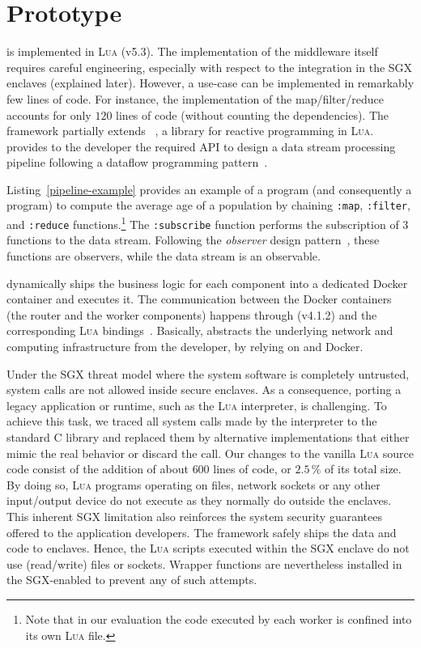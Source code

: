 
\chapter{\SS{} Prototype}
\label{chap:proto}

\SS{} is implemented in \textsc{Lua} (v5.3).
The implementation of the middleware itself requires careful engineering, especially with respect to the integration in the SGX enclaves (explained later).
However, a \SS{} use-case can be implemented in remarkably few lines of code.
For instance, the implementation of the map/filter/reduce accounts for only $120$ lines of code (without counting the dependencies).
The framework partially extends \rxl~\cite{github:rxlua}, a library for reactive programming in \textsc{Lua}.
\rxl provides to the developer the required API to design a data stream processing pipeline following a dataflow programming pattern~\cite{uustalu_essence_2005}.

Listing~\ref{pipeline-example} provides an example of a \rxl program (and consequently a \SS{} program) to compute the average age of a population by chaining \texttt{:map}, \texttt{:filter}, and \texttt{:reduce} functions.\footnote{Note that in our evaluation the code executed by each worker is confined into its own \textsc{Lua} file.}
The \texttt{:subscribe} function performs the subscription of 3 functions to the data stream.
Following the \emph{observer} design pattern~\cite{szallies_using_1997}, these functions are observers, while the data stream is an observable.

\SS{} dynamically ships the business logic for each component into a dedicated Docker container and executes it.
The communication between the Docker containers (the router and the worker components) happens through \zmq (v4.1.2) and the corresponding \textsc{Lua} bindings~\cite{github:lzmq}.
Basically, \SS{} abstracts the underlying network and computing infrastructure from the developer, by relying on \zmq and Docker.

Under the SGX threat model where the system software is completely untrusted, system calls are not allowed inside secure enclaves.
As a consequence, porting a legacy application or runtime, such as the \textsc{Lua} interpreter, is challenging.
To achieve this task, we traced all system calls made by the interpreter to the standard C library and replaced them by alternative implementations that either mimic the real behavior or discard the call.
Our changes to the vanilla \textsc{Lua} source code consist of the addition of about $600$ lines of code, or $2.5\,\mathit{\%}$ of its total size.
By doing so, \textsc{Lua} programs operating on files, network sockets or any other input/output device do not execute as they normally do outside the enclaves.
This inherent SGX limitation also reinforces the system security guarantees offered to the application developers.
The \SS{} framework safely ships the data and code to enclaves.
Hence, the \textsc{Lua} scripts executed within the SGX enclave do not use (read/write) files or sockets.
Wrapper functions are nevertheless installed in the SGX-enabled \luavm to prevent any of such attempts.

